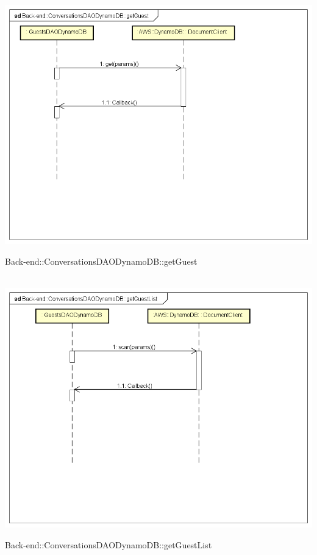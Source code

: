 \\ \includegraphics[width=\textwidth,height=\textheight,keepaspectratio]{images/diagrams/back-end/Ufficial_Backend/Back-end__ConversationsDAODynamoDB__getGuest.png} 	\caption{Back-end::ConversationsDAODynamoDB::getGuest}
\\ \includegraphics[width=\textwidth,height=\textheight,keepaspectratio]{images/diagrams/back-end/Ufficial_Backend/Back-end__ConversationsDAODynamoDB__getGuestList.png} 	\caption{Back-end::ConversationsDAODynamoDB::getGuestList}
